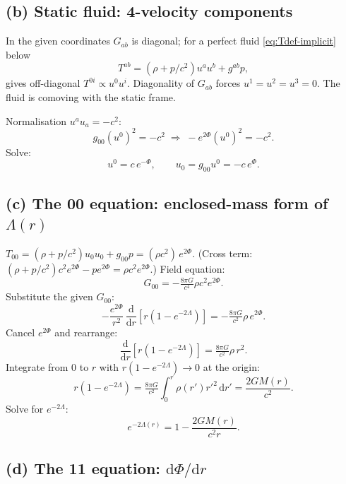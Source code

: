 \documentclass[11pt]{article}
\newcommand{\de}{\mathrm{d}}
\begin{document}
\subsection*{(b) Static fluid: 4-velocity components}

In the given coordinates $G_{ab}$ is diagonal; for a perfect fluid \eqref{eq:Tdef-implicit} below
\[
T^{ab} = (\rho + p/c^2) u^a u^b + g^{ab} p, \tag{1}\label{eq:Tdef-implicit}
\]
gives off-diagonal $T^{0i}\propto u^0 u^i$. Diagonality of $G_{ab}$ forces $u^1=u^2=u^3=0$. The fluid is comoving with the static frame.

Normalisation $u^a u_a = -c^2$:
\[
g_{00}(u^0)^2 = -c^2 \;\Rightarrow\; -e^{2\Phi}(u^0)^2 = -c^2.
\]
Solve:
\[
\boxed{\;u^0 = c\,e^{-\Phi},\qquad u_0 = g_{00}u^0 = -c\,e^{\Phi}.\;}
\]

\subsection*{(c) The 00 equation: enclosed-mass form of $\Lambda(r)$}

$T_{00} = (\rho+p/c^2) u_0 u_0 + g_{00}p = (\rho c^2)\,e^{2\Phi}$. (Cross term: $(\rho+p/c^2)c^2 e^{2\Phi} - p e^{2\Phi} = \rho c^2 e^{2\Phi}$.)
Field equation:
\[
G_{00} = -\tfrac{8\pi G}{c^4}\rho c^2 e^{2\Phi}.
\]
Substitute the given $G_{00}$:
\[
-\frac{e^{2\Phi}}{r^2}\,\frac{\de}{\de r}\!\left[r(1-e^{-2\Lambda})\right] = -\tfrac{8\pi G}{c^2}\rho\, e^{2\Phi}.
\]
Cancel $e^{2\Phi}$ and rearrange:
\[
\frac{\de}{\de r}\!\left[r(1-e^{-2\Lambda})\right] = \tfrac{8\pi G}{c^2}\rho\,r^2.
\]
Integrate from $0$ to $r$ with $r(1-e^{-2\Lambda})\to 0$ at the origin:
\[
r(1-e^{-2\Lambda}) = \tfrac{8\pi G}{c^2}\!\int_0^r \rho(r')r'^2\,\de r' = \frac{2GM(r)}{c^2}.
\]
Solve for $e^{-2\Lambda}$:
\begin{equation}
\boxed{\;e^{-2\Lambda(r)} = 1 - \frac{2GM(r)}{c^2 r}.\;}
\label{eq:Lambda}
\end{equation}

\subsection*{(d) The 11 equation: $\de\Phi/\de r$}
\end{document}
